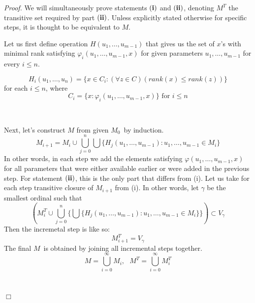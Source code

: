 \documentclass[12pt,a4paper]{article}
\newenvironment{proof}
{\noindent \textit{Proof.}}
{\hspace*{\fill} $\Box$}
\begin{document}
\begin{proof}
We will simultaneously prove statements $\bold{(i)}$ and $\bold{(ii)}$, denoting $M^T$ the transitive set required by part $\bold{(ii)}$. Unless explicitly stated otherwise for specific steps, it is thought to be equivalent to $M$.

Let us first define operation $H(u_1, \ldots, u_{m-1})$ that gives us the set of $x$'s with minimal rank satisfying $\varphi_i(u_1, \ldots, u_{m-1}, x)$ for given parameters $u_1, \ldots, u_{m-1}$ for every $i \leq n$.

\begin{equation}
H_i(u_1, \ldots, u_n) = \{x \in C_i: (\forall z \in C)(rank(x) \leq rank(z))\}
\end{equation}
for each $i \leq n$, where
\begin{equation}
C_i = \{x: \varphi_i(u_1, \ldots, u_{m-1}, x)\} \mbox{ for $i \leq n$}
\end{equation}

\

Next, let's construct $M$ from given $M_0$ by induction. 
\begin{equation}
M_{i+1} = M_i \cup \bigcup_{j=0}^{n} \bigcup \{H_j(u_1, \ldots, u_{m-1}): u_1, \ldots, u_{m-1} \in M_i\}
\end{equation}
In other words, in each step we add the elements satisfying $\varphi(u_1, \ldots, u_{m-1}, x)$ for all parameters that were either available earlier or were added in the previous step. 
For statement $\bold{(ii)}$, this is the only part that differs from (i). Let us take for each step transitive closure of $M_{i+1}$ from (i). In other words, let $\gamma$ be the smallest ordinal such that 
\begin{equation}
(M^T_i \cup \bigcup_{j=0}^{n} \{\bigcup\{H_j(u_1, \ldots, u_{m-1}): u_1, \ldots, u_{m-1} \in M_i\}\}) \subset V_\gamma
\end{equation}
Then the incremetal step is like so:
\begin{equation}
M^T_{i+1} = V_\gamma
\end{equation}
The final $M$ is obtained by joining all incremental steps together. 
\begin{equation}
M = \bigcup_{i=0}^{\infty} M_i, \mbox{  }M^T = \bigcup_{i=0}^{\infty} M^T_i
\end{equation}

\


\end{proof}
\end{document}
